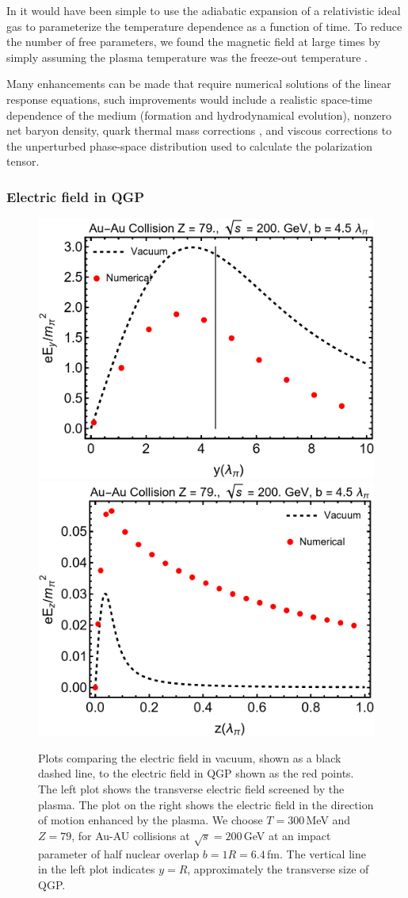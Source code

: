 In \cite{Grayson:2022asf} it would have been simple to use the adiabatic expansion of a relativistic ideal gas \cite{Bjorken:1982qr} to parameterize the temperature dependence as a function of time. To reduce the number of free parameters, we found the magnetic field at large times by simply assuming the plasma temperature was the freeze-out temperature .

Many enhancements can be made that require numerical solutions of the linear response equations, such improvements would include a realistic space-time dependence of the medium (formation and hydrodynamical evolution), nonzero net baryon density, quark thermal mass corrections \cite{Weldon:1982bn}, and viscous corrections to the unperturbed phase-space distribution used to calculate the polarization tensor.

\subsubsection{Electric field in QGP}

\phantom{Phantom text}
\begin{figure}[ht]
\centering
\includegraphics[width=0.45\linewidth]{plots/chap02QCD/Eyy.png}
\hspace{0.05\linewidth}
\includegraphics[width=0.45\linewidth]{plots/chap02QCD/Ezz.png}
\caption{Plots comparing the electric field in vacuum, shown as a black dashed line, to the electric field in QGP shown as the red points. The left plot shows the transverse electric field screened by the plasma. The plot on the right shows the electric field in the direction of motion enhanced by the plasma. We choose $T = 300$\,MeV and $Z=79$, for Au-AU collisions at $\sqrt{s} = 200$\,GeV at an impact parameter of half nuclear overlap $b = 1 R = 6.4\,$fm. The vertical line in the left plot indicates $ y = R$, approximately the transverse size of QGP. \label{fig:efcomp}}
\end{figure}



